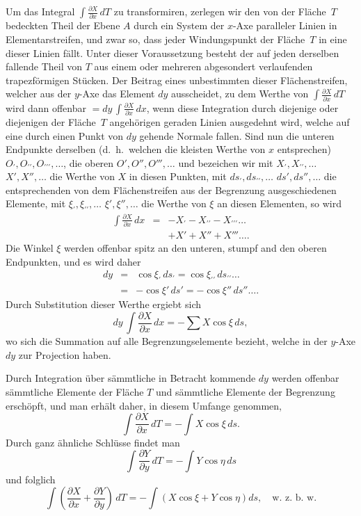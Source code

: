 \documentclass[a4paper,12pt]{article}
\begin{document}
Um das Integral
$\displaystyle \int \frac{\partial X}{\partial x} \, dT$
zu transformiren, zerlegen wir den von der Fl\"{a}che~$T$
bedeckten Theil der Ebene $A$ durch ein System der $x$-Axe
paralleler Linien in Elementarstreifen, und zwar so, dass jeder
Windungspunkt der Fl\"{a}che~$T$ in eine dieser Linien f\"{a}llt.
Unter dieser Voraussetzung besteht der auf jeden derselben
fallende Theil von $T$ aus einem oder mehreren abgesondert
verlaufenden trapezf\"{o}rmigen St\"{u}cken.  Der Beitrag eines
unbestimmten dieser Fl\"{a}chenstreifen, welcher aus der $y$-Axe
das Element $dy$ ausscheidet, zu dem Werthe von
$\displaystyle \int \frac{\partial X}{\partial x} \, dT$
wird dann offenbar
$\displaystyle = dy \, \int \frac{\partial X}{\partial x} \, dx$,
wenn diese Integration durch diejenige oder diejenigen der
Fl\"{a}che~$T$ angeh\"{o}rigen geraden Linien ausgedehnt wird,
welche auf eine durch einen Punkt von $dy$ gehende Normale
fallen.  Sind nun die unteren Endpunkte derselben (d.~h.\ welchen
die kleisten Werthe von $x$ entsprechen)
$O_\prime, O_{\prime\prime}, O_{\prime\prime\prime},\ldots$,
die oberen
$O', O'', O''',\ldots$
und bezeichen wir mit
$X_\prime, X_{\prime\prime},\ldots$ $X', X'',\ldots$
die Werthe von $X$ in diesen Punkten, mit
$ds_\prime, ds_{\prime\prime},\ldots$ $ds', ds'',\ldots$
die entsprechenden von dem Fl\"{a}chenstreifen
aus der Begrenzung ausgeschiedenen Elemente, mit
$\xi_\prime, \xi_{\prime\prime},\ldots$ $\xi', \xi'',\ldots$
die Werthe von $\xi$ an diesen Elementen, so wird
\begin{eqnarray*}
\int \frac{\partial X}{\partial x} \, dx
   &=& - X_\prime - X_{\prime\prime} - X_{\prime\prime\prime} \ldots \\
   & & + X' + X'' + X''' \ldots .
\end{eqnarray*}
Die Winkel $\xi$ werden offenbar spitz an den unteren, stumpf and
den oberen Endpunkten, und es wird daher
\begin{eqnarray*}
dy &=&   \cos \xi_\prime \, ds_\prime
    =    \cos \xi_{\prime\prime} \, ds_{\prime\prime} \ldots \\
   &=& - \cos \xi' \, ds'
    =  - \cos \xi'' \, ds''\ldots .
\end{eqnarray*}
Durch Substitution dieser Werthe ergiebt sich
\[ dy \, \int \frac{\partial X}{\partial x} \, dx
   = - {\textstyle\sum} X \cos \xi \, ds,\]
wo sich die Summation auf alle Begrenzungselemente bezieht,
welche in der $y$-Axe $dy$ zur Projection haben.

Durch Integration \"{u}ber s\"{a}mmtliche in Betracht kommende
$dy$ werden offenbar s\"{a}mmtliche Elemente der Fl\"{a}che $T$
und s\"{a}mmtliche Elemente der Begrenzung ersch\"{o}pft, und man
erh\"{a}lt daher, in diesem Umfange genommen,
\[ \int \frac{\partial X}{\partial x} \, dT
   = - \int X \cos \xi \, ds.\]
Durch ganz \"{a}hnliche Schl\"{u}sse findet man
\[ \int \frac{\partial Y}{\partial y} \, dT
   = - \int Y \cos \eta \, ds \]
und folglich
\[ \int \left(
         \frac{\partial X}{\partial x}
       + \frac{\partial Y}{\partial y}
      \right) \, dT
   = - \int (X \cos \xi + Y \cos \eta) ds, \quad\mbox{w.~z.~b.~w.} \]
\end{document}

